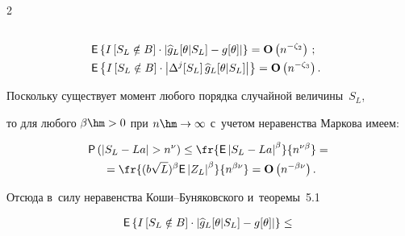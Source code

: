 \begin{multicols}{2}
\begin{align}
\label{L:5.12-1}


 \\


  &


  \Ep\left\{ I\left[S_L\notin B\right]\cdot


  \left| \widehat{g}_L[\theta|S_L]-g[\theta]\right|\right\}


  =\Op\left( n^{-\zeta_2}\right)\,;


 \label{L:5.12-2}\\


 &   \Ep\left\{ I\left[S_L\notin B\right]\cdot


  \left|\Delta^{j}[S_L]\, \widehat{g}_L[\theta|S_L]\right|\right\}


  =\Op\left( n^{-\zeta_3}\right).\!\!


 \label{L:5.12-3}


  \end{align}





 \Do


  Поскольку существует момент любого порядка случайной величины~$S_L$, 


  то для любого $\beta\hm>0$ при $n\hm\to\infty$ с~учетом неравенства Маркова имеем:


 \begin{multline*}


{\sf P}\left(\left|S_L - La \right|>n^{\nu}\right)\le


  \fr{\Ep \left|S_L-La \right|^\beta}{n^{\nu \beta}}={}\\


  {}=


  \fr{(b\sqrt{L})^\beta\Ep \left|Z_L\right|^\beta}{n^{\beta\nu }}=


  \Op\left( n^{-\beta\nu}\right).


 \end{multline*}








  Отсюда в~силу неравенства Ко\-ши--Бу\-ня\-ков\-ско\-го и~тео\-ре\-мы~5.1


  \begin{multline*}


    \Ep\left\{ I\left[S_L\notin B\right]\cdot


  \left| \widehat{g}_L[\theta|S_L]-g[\theta]\right|\right\}\le{}


  \\



\end{multline*}
\end{multicols}
